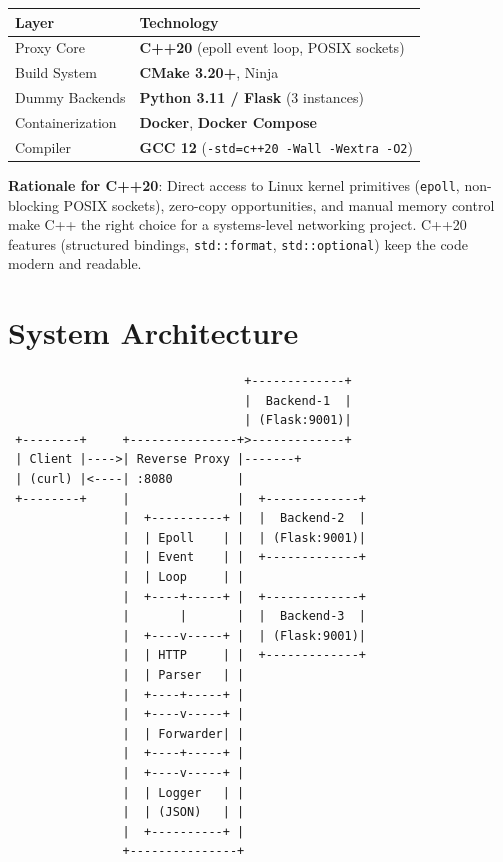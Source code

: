 \documentclass[11pt, a4paper]{article}
\begin{document}
\begin{table}[h]
\centering
\begin{tabularx}{\textwidth}{l X}
\toprule
\textbf{Layer} & \textbf{Technology} \\
\midrule
Proxy Core & \textbf{C++20} (epoll event loop, POSIX sockets) \\
Build System & \textbf{CMake 3.20+}, Ninja \\
Dummy Backends & \textbf{Python 3.11 / Flask} (3 instances) \\
Containerization & \textbf{Docker}, \textbf{Docker Compose} \\
Compiler & \textbf{GCC 12} (\texttt{-std=c++20 -Wall -Wextra -O2}) \\
\bottomrule
\end{tabularx}
\end{table}

\textbf{Rationale for C++20}: Direct access to Linux kernel primitives (\texttt{epoll}, non-blocking POSIX sockets), zero-copy opportunities, and manual memory control make C++ the right choice for a systems-level networking project. C++20 features (structured bindings, \texttt{std::format}, \texttt{std::optional}) keep the code modern and readable.

\section{System Architecture}

\begin{verbatim}
                                 +-------------+
                                 |  Backend-1  |
                                 | (Flask:9001)|
 +--------+     +---------------+>-------------+
 | Client |---->| Reverse Proxy |-------+
 | (curl) |<----| :8080         |
 +--------+     |               |  +-------------+
                |  +----------+ |  |  Backend-2  |
                |  | Epoll    | |  | (Flask:9001)|
                |  | Event    | |  +-------------+
                |  | Loop     | |
                |  +----+-----+ |  +-------------+
                |       |       |  |  Backend-3  |
                |  +----v-----+ |  | (Flask:9001)|
                |  | HTTP     | |  +-------------+
                |  | Parser   | |
                |  +----+-----+ |
                |  +----v-----+ |
                |  | Forwarder| |
                |  +----+-----+ |
                |  +----v-----+ |
                |  | Logger   | |
                |  | (JSON)   | |
                |  +----------+ |
                +---------------+
\end{verbatim}
\end{document}
